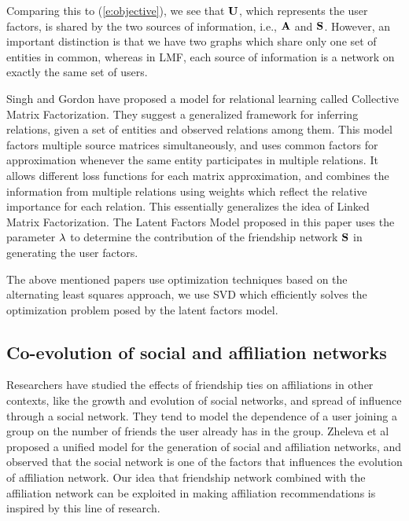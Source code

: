 Comparing this to (\ref{e:objective}), we see that $\mathbf{U}$, which represents the user factors, is shared by the two sources of information, i.e., $\mathbf{A}$ and $\mathbf{S}$. However, an important distinction is that we have two graphs which share only one set of entities in common, whereas in LMF, each source of information is a network on exactly the same set of users.

Singh and Gordon have proposed a model for relational learning called Collective Matrix Factorization\cite{SinghCMF}. They suggest a generalized framework for inferring relations, given a set of entities and observed relations among them. This model factors multiple source matrices simultaneously, and uses common factors for approximation whenever the same entity participates in multiple relations. It allows different loss functions for each matrix approximation, and combines the information from multiple relations using weights which reflect the relative importance for each relation. This essentially generalizes the idea of Linked Matrix Factorization. The Latent Factors Model proposed in this paper uses the parameter $\lambda$ to determine the contribution of the friendship network $\mathbf{S}$ in generating the user factors.

The above mentioned papers use optimization techniques based on the alternating least squares approach, we use SVD which efficiently solves the optimization problem posed by the latent factors model.

\subsection{Co-evolution of social and affiliation networks}
Researchers have studied the effects of friendship ties on affiliations in other contexts, like the growth and evolution of social networks\cite{GroupFormation}, and spread of influence through a social network\cite{KleinbergInfluence, ChenInfMax}. They tend to model the dependence of a user joining a group on the number of friends the user already has in the group. Zheleva et al\cite{Coevolution} proposed a unified model for the generation of social and affiliation networks, and observed that the social network is one of the factors that influences the evolution of affiliation network. Our idea that friendship network combined with the affiliation network can be exploited in making affiliation recommendations is inspired by this line of research.
